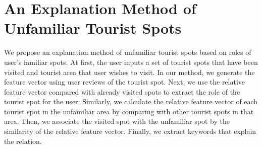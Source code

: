 \documentclass[journal]{IAENGtran}
\begin{document}
\section{An Explanation Method of Unfamiliar Tourist Spots}
\label{sec:An Explanation Method of Unfamiliar Tourist Spots}
We propose an explanation method of unfamiliar tourist spots based on roles of user's familiar spots.
At first, the user inputs a set of tourist spots that have been visited and tourist area that user wishes to visit.
In our method, we generate the feature vector using user reviews of the tourist spot.
Next, we use the relative feature vector compared with already visited spots to extract the role of the tourist spot for the user.
Similarly, we calculate the relative feature vector of each tourist spot in the unfamiliar area by comparing with other tourist spots in that area.
Then, we associate the visited spot with the unfamiliar spot by the similarity of the relative feature vector.
Finally, we extract keywords that explain the relation.

\end{document}
